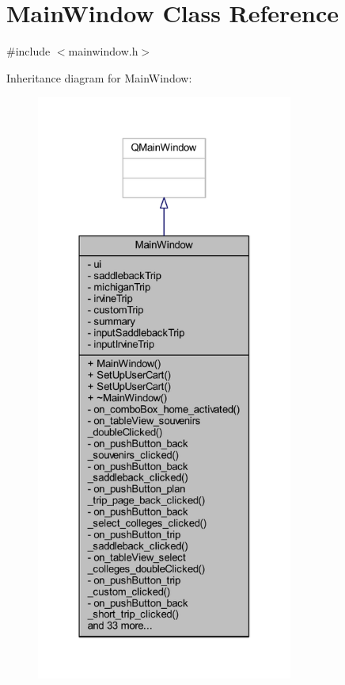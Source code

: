\hypertarget{class_main_window}{}\section{Main\+Window Class Reference}
\label{class_main_window}


{\ttfamily \#include $<$mainwindow.\+h$>$}



Inheritance diagram for Main\+Window\+:
\nopagebreak
\begin{figure}[H]
\begin{center}
\leavevmode
\includegraphics[height=550pt]{class_main_window__inherit__graph}
\end{center}
\end{figure}


